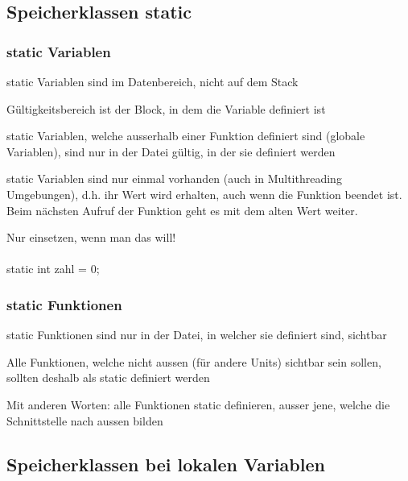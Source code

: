 			\subsection{Speicherklassen static}
				\begin{minipage}[t]{9 cm}
					\subsubsection{static Variablen}
					\begin{compactitem}
						\item static Variablen sind im Datenbereich, nicht auf dem Stack
						\item Gültigkeitsbereich ist der Block, in dem die Variable definiert ist
						\item static Variablen, welche ausserhalb einer Funktion definiert sind (globale Variablen), sind nur in der Datei gültig, in der sie definiert werden
						\item static Variablen sind nur einmal vorhanden (auch in Multithreading Umgebungen), d.h. ihr Wert wird erhalten, auch wenn die Funktion beendet ist. Beim nächsten Aufruf der Funktion geht es mit dem alten Wert weiter.
						\item Nur einsetzen, wenn man das will!\\\\
						static int zahl = 0;
					\end{compactitem}
				\end{minipage}
				\hspace*{0.5cm}
				\begin{minipage}[t]{9 cm}
					\subsubsection{static Funktionen}
					\begin{compactitem}
						\item static Funktionen sind nur in der Datei, in welcher sie definiert sind,
						sichtbar
						\item Alle Funktionen, welche nicht aussen (für andere Units) sichtbar sein
						sollen, sollten deshalb als static definiert werden
						\item Mit anderen Worten: alle Funktionen static definieren, ausser jene, welche die Schnittstelle
						nach aussen bilden
					\end{compactitem}
				\end{minipage}
			\subsection{Speicherklassen bei lokalen Variablen}
